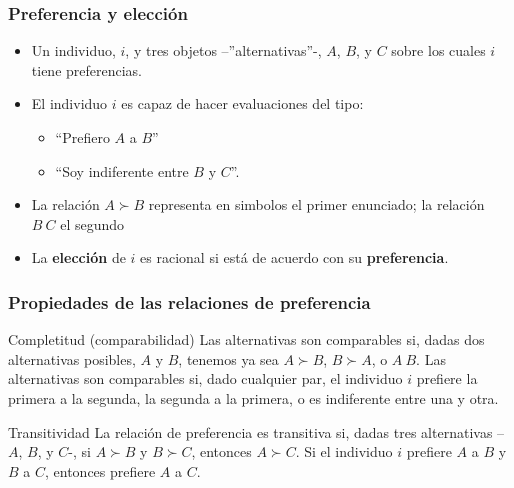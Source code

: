 \documentclass[14pt,aspectratio=169]{beamer}
\begin{document}
  \begin{frame}\frametitle{Preferencia y elección}
  \begin{itemize}
    \item Un individuo, $i$, y tres objetos --''alternativas''-, $A$, $B$, y $C$
      sobre los cuales $i$ tiene preferencias.
      \item El individuo $i$ es capaz de hacer evaluaciones
        del tipo:
        \begin{itemize}\itemsep 5pt \smallskip
        \item ``Prefiero $A$ a $B$''
          \item ``Soy indiferente entre $B$ y $C$''. 
          \end{itemize}
          \item La relación $A \succ B$ representa en simbolos el
            primer enunciado; la relación $B ~ C$ el segundo
            \item La \textbf{elección} de $i$ es racional
              si está de acuerdo con su \textbf{preferencia}. 
            \end{itemize}
  \end{frame}


\begin{frame}\frametitle{Propiedades de las relaciones de preferencia}
\begin{block}{Completitud (comparabilidad)}
Las alternativas son comparables si,
dadas dos alternativas posibles, $A$ y $B$, tenemos ya sea $A \succ
B$, $B \succ A$, o $A ~ B$. Las alternativas son comparables si,
dado cualquier par, el individuo $i$ prefiere la primera a la
segunda, la segunda a la primera, o es indiferente entre una y otra.
\end{block}
\begin{block}{Transitividad}
La relación de preferencia es transitiva si,
dadas tres alternativas --$A$, $B$, y $C$-, si $A \succ B$ y $B \succ
C$, entonces $A \succ C$. Si el individuo $i$ prefiere $A$ a $B$ y $B$ a $C$, entonces prefiere $A$ a $C$.
\end{block}
\end{frame}
\end{document}
